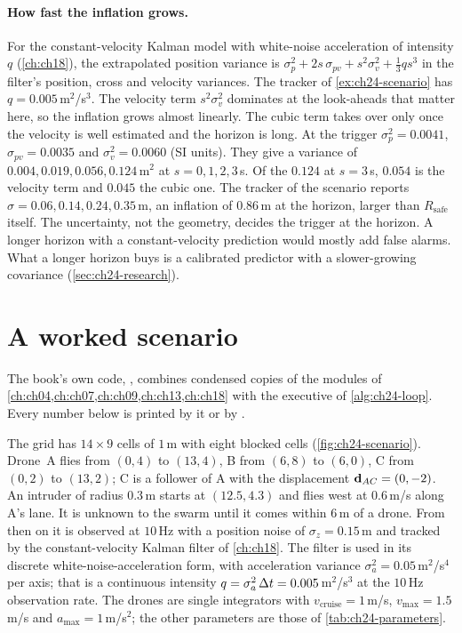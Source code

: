 \paragraph{How fast the inflation grows.}
For the constant-velocity Kalman model with white-noise acceleration of
intensity $q$ (\cref{ch:ch18}), the extrapolated position variance is
$\sigma_p^2 + 2s\,\sigma_{pv} + s^2\sigma_v^2 + \tfrac13 q s^3$ in the
filter's position, cross and velocity variances. The tracker of
\cref{ex:ch24-scenario} has $q = 0.005$\,m$^2$/s$^3$. The velocity term
$s^2\sigma_v^2$ dominates at the look-aheads that matter here, so the
inflation grows almost linearly. The cubic term takes over only once the
velocity is well estimated and the horizon is long. At the trigger
$\sigma_p^2 = 0.0041$, $\sigma_{pv} = 0.0035$ and $\sigma_v^2 = 0.0060$ (SI
units). They give a variance of $0.004, 0.019, 0.056, 0.124$\,m$^2$ at
$s = 0, 1, 2, 3$\,s. Of the $0.124$ at $s = 3$\,s, $0.054$ is the
velocity term and $0.045$ the cubic one. The tracker of the scenario
reports $\sigma = 0.06, 0.14, 0.24, 0.35$\,m,
an inflation of $0.86$\,m at the horizon, larger than $R_{\mathrm{safe}}$
itself. The uncertainty, not the geometry, decides the trigger at the
horizon. A longer horizon with a constant-velocity prediction would mostly
add false alarms. What a longer horizon buys is a calibrated predictor with
a slower-growing covariance (\cref{sec:ch24-research}).

\section{A worked scenario}
\label{sec:ch24-scenario}

The book's own code, , combines condensed copies
of the modules of \cref{ch:ch04,ch:ch07,ch:ch09,ch:ch13,ch:ch18} with the
executive of \cref{alg:ch24-loop}. Every number below is printed by it or by
.

\begin{example}
\label{ex:ch24-scenario}
The grid has $14 \times 9$ cells of $1$\,m with eight blocked cells
(\cref{fig:ch24-scenario}). Drone~A flies from $(0,4)$ to $(13,4)$, B from
$(6,8)$ to $(6,0)$, C from $(0,2)$ to $(13,2)$; C is a follower of A with the
displacement $\mathbf{d}_{AC} = (0, -2)$. An intruder of radius $0.3$\,m starts
at $(12.5, 4.3)$ and flies west at $0.6$\,m/s along A's lane. It is unknown
to the swarm until it comes within $6$\,m of a drone. From then on it is
observed at $10$\,Hz with a position noise of $\sigma_z = 0.15$\,m and tracked
by the constant-velocity Kalman filter of \cref{ch:ch18}. The filter is used
in its discrete white-noise-acceleration form, with acceleration variance
$\sigma_a^2 = 0.05$\,m$^2$/s$^4$ per axis; that is a continuous
intensity $q = \sigma_a^2\,\Delta t = 0.005$\,m$^2$/s$^3$ at the $10$\,Hz
observation rate. The drones are single integrators with
$v_{\mathrm{cruise}} = 1$\,m/s, $v_{\max} = 1.5$\,m/s and $a_{\max} = 1$\,m/s$^2$; the other
parameters are those of \cref{tab:ch24-parameters}.
\end{example}

